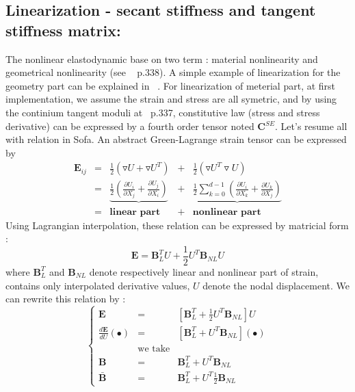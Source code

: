 \documentclass[a4paper,10pt]{article}
\begin{document}
\subsection{Linearization - secant stiffness and tangent stiffness matrix: }
The nonlinear elastodynamic base on two term : material nonlinearity and geometrical nonlinearity (see  ~\cite{FEMBook} p.338). A simple example of linearization for the geometry part can be explained in ~\cite{NonlinearGeo}. For linearization of meterial part, at first implementation, we assume the strain and stress are all symetric, and by using the continium tangent moduli at ~\cite{NonlinearGeo}p.337, constitutive law (stress and stress derivative) can be expressed by a fourth order tensor noted \textbf{C}$^{SE}$. Let's resume all with relation in Sofa. An abstract Green-Lagrange strain tensor can be expressed by
\[
\begin{array}{ccccc}
\textbf{E}_{ij}   &=& \frac{1}{2}( \triangledown U  +  \triangledown U^T  )  &+&  \frac{1}{2}( \triangledown U^T \triangledown U )\\
                  &=& \underbrace{\frac{1}{2}( \frac{\partial U_i}{\partial X_j}  +  \frac{\partial U_j}{\partial X_i}  )}  &+&
                      \underbrace{\frac{1}{2}\sum_{k=0}^{d-1}( \frac{\partial U_i}{\partial X_k}  +  \frac{\partial U_k}{\partial X_j} )}\\
                  &=& \textbf{linear part}  &+&  \textbf{nonlinear part}
\end{array}
\]
Using Lagrangian interpolation, these relation can be expressed by matricial form :   
\[
\textbf{E} = \textbf{B}^T_L U + \frac{1}{2} U^T \textbf{B}_{NL}  U             
\]
where $\textbf{B}^T_L$ and $\textbf{B}_{NL}$ denote respectively linear and nonlinear part of strain, contains only interpolated derivative values, $U$ denote the nodal displacement. We can rewrite this relation by : 
\[
\left\{ 
\begin{array}{rcl}
\textbf{E}                      &=& [ \textbf{B}^T_L + \frac{1}{2} U^T \textbf{B}_{NL} ] U  \\  
\frac{d\textbf{E}}{dU}(\bullet) &=& [ \textbf{B}^T_L +  U^T \textbf{B}_{NL} ] (\bullet)     \\
            &\text{we take} &                                                               \\
      \textbf{B}   &=&  \textbf{B}^T_L +  U^T \textbf{B}_{NL}                               \\ 
 \bar{\textbf{B}}  &=&  \textbf{B}^T_L +  U^T \frac{1}{2}\textbf{B}_{NL}           
\end{array}\right.
\]
\end{document}
